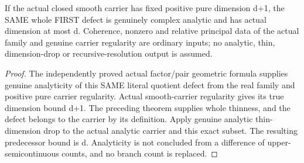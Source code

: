 \begin{theorem}
\label{hir:sharp-actual-family-first-defect-analytic-dimension-drop}
\leanok
If the actual closed smooth carrier has fixed positive pure dimension d+1,
the SAME whole FIRST defect is genuinely complex analytic and has actual
dimension at most d. Coherence, nonzero and relative principal data of the
actual family and genuine carrier regularity are ordinary inputs; no analytic,
thin, dimension-drop or recursive-resolution output is assumed.
\end{theorem}
\begin{proof}
The independently proved actual factor/pair geometric formula supplies genuine
analyticity of this SAME literal quotient defect from the real family and
positive pure carrier regularity. Actual smooth-carrier regularity gives its
true dimension bound d+1. The preceding theorem supplies whole thinness, and
the defect belongs to the carrier by its definition. Apply genuine analytic
thin-dimension drop to the actual analytic carrier and this exact subset.
The resulting predecessor bound is d. Analyticity is not concluded from a
difference of upper-semicontinuous counts, and no branch count is replaced.
\end{proof}

